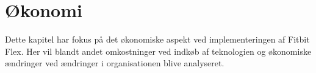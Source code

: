\chapter{Økonomi}
Dette kapitel har fokus på det økonomiske aspekt ved implementeringen af Fitbit Flex. Her vil blandt andet omkostninger ved indkøb af teknologien og økonomiske ændringer ved ændringer i organisationen blive analyseret.